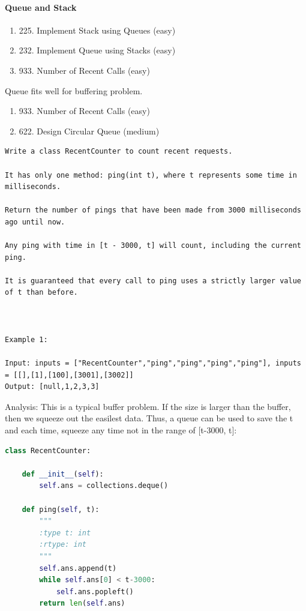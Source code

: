 \documentclass[../main.tex]{subfiles}
\begin{document}
\paragraph{Queue and Stack}
\begin{enumerate}
    \item 225. Implement Stack using Queues (easy)
    \item 232. Implement Queue using Stacks  (easy)
    \item 933. Number of Recent Calls (easy)
\end{enumerate}
Queue fits well for buffering problem.
\begin{enumerate}
    \item 933. Number of Recent Calls (easy)
    \item 622. Design Circular Queue (medium)
\end{enumerate}
\begin{lstlisting}
Write a class RecentCounter to count recent requests.

It has only one method: ping(int t), where t represents some time in milliseconds.

Return the number of pings that have been made from 3000 milliseconds ago until now.

Any ping with time in [t - 3000, t] will count, including the current ping.

It is guaranteed that every call to ping uses a strictly larger value of t than before.

 

Example 1:

Input: inputs = ["RecentCounter","ping","ping","ping","ping"], inputs = [[],[1],[100],[3001],[3002]]
Output: [null,1,2,3,3]
\end{lstlisting}
Analysis: This is a typical buffer problem. If the size  is larger than the buffer, then we squeeze out the easilest data. Thus, a queue can be used to save the t and each time, squeeze any time not in the range of [t-3000, t]:
\begin{lstlisting}[language=Python]
class RecentCounter:

    def __init__(self):
        self.ans = collections.deque()

    def ping(self, t):
        """
        :type t: int
        :rtype: int
        """
        self.ans.append(t)
        while self.ans[0] < t-3000:
            self.ans.popleft()
        return len(self.ans)
\end{lstlisting}
\end{document}
